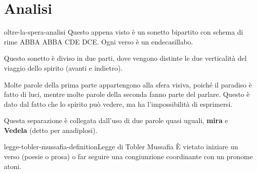 \documentclass[preview]{standalone}
\begin{document}
\section{Analisi}

\begin{snippet}{oltre-la-spera-analisi}
    Questo appena visto è un sonetto bipartito con schema di rime ABBA ABBA CDE DCE. Ogni verso è un endecasillabo.

    Questo sonetto è diviso in due parti, dove vengono distinte le due verticalità del viaggio dello spirito
    (avanti e indietro).
    
    Molte parole della prima parte appartengono alla sfera visiva, poiché il paradiso
    è fatto di luci, mentre molte parole della seconda fanno parte del parlare.
    Questo è dato dal fatto che lo spirito può vedere, ma ha l'impossibilità di esprimersi.
    
    Questa separazione è collegata dall'uso di due parole quasi uguali,
    \textbf{mira} e \textbf{Vedela} (detto per anadiplosi).
\end{snippet}


\begin{snippetdefinition}{legge-tobler-mussafia-definition}{Legge di Tobler Mussafia}
    È vietato iniziare un verso (poesie o prosa) o far seguire una congiunzione coordinante
    con un pronome atoni.
\end{snippetdefinition}
\end{document}
